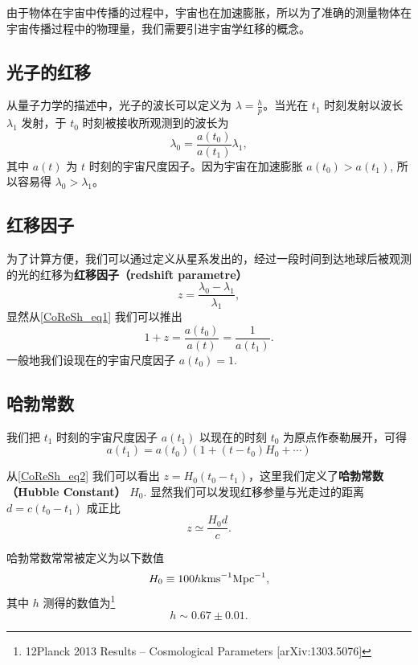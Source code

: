 
\begin{issues}
\issueMissDepend
\end{issues}

由于物体在宇宙中传播的过程中，宇宙也在加速膨胀，所以为了准确的测量物体在宇宙传播过程中的物理量，我们需要引进宇宙学红移的概念。

\subsection{光子的红移}
从量子力学的描述中，光子的波长可以定义为 $\lambda=\frac{h}{p}$。当光在 $t_1$ 时刻发射以波长 $\lambda_1$ 发射，于 $t_0$ 时刻被接收所观测到的波长为
\begin{equation}\label{CoReSh_eq1}
\lambda_0=\frac{a(t_0)}{a(t_1)}\lambda_1,
\end{equation}
其中 $a(t)$ 为 $t$ 时刻的宇宙尺度因子。因为宇宙在加速膨胀 $a(t_0)>a(t_1)$, 所以容易得 $\lambda_0>\lambda_1$。

\subsection{红移因子}
为了计算方便，我们可以通过定义从星系发出的，经过一段时间到达地球后被观测的光的红移为\textbf{红移因子（redshift parametre）}
\begin{equation}
z=\frac{\lambda_0-\lambda_1}{\lambda_1},
\end{equation}
显然从\autoref{CoReSh_eq1} 我们可以推出
\begin{equation}
1+z=\frac{a(t_0)}{a(t)}=\frac{1}{a(t_1)}. \label{CoReSh_eq2}
\end{equation}
一般地我们设现在的宇宙尺度因子 $a(t_0)=1$.

\subsection{哈勃常数}
我们把 $t_1$ 时刻的宇宙尺度因子 $a(t_1)$ 以现在的时刻 $t_0$ 为原点作泰勒展开，可得
\begin{equation}
a(t_1)=a(t_0)(1+(t-t_0)H_0+\cdots)
\end{equation}

从\autoref{CoReSh_eq2} 我们可以看出 $z=H_0(t_0-t_1)$，这里我们定义了\textbf{哈勃常数（Hubble Constant）} $H_0$. 显然我们可以发现红移参量与光走过的距离 $d=c(t_0-t_1)$ 成正比
\begin{equation}
z\simeq\frac{H_0d}{c}.
\end{equation}

哈勃常数常常被定义为以下数值
\begin{equation}
H_0 \equiv100 h {\rm kms}^{-1}{\rm Mpc}^{-1},
\end{equation}
其中 $h$ 测得的数值为\footnote{12Planck 2013 Results – Cosmological Parameters [arXiv:1303.5076]}
\begin{equation}
h\sim 0.67 \pm 0.01.
\end{equation}